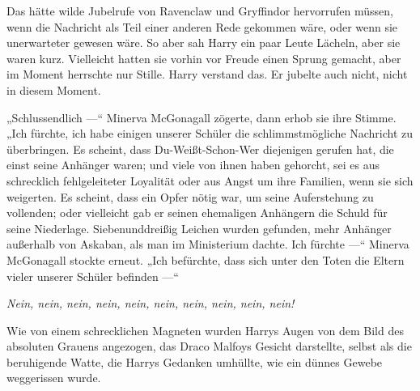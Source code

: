 Das hätte wilde Jubelrufe von Ravenclaw und Gryffindor hervorrufen müssen, wenn die Nachricht als Teil einer anderen Rede gekommen wäre, oder wenn sie unerwarteter gewesen wäre. So aber sah Harry ein paar Leute Lächeln, aber sie waren kurz. Vielleicht hatten sie vorhin vor Freude einen Sprung gemacht, aber im Moment herrschte nur Stille. Harry verstand das. Er jubelte auch nicht, nicht in diesem Moment.

„Schlussendlich —“ Minerva McGonagall zögerte, dann erhob sie ihre Stimme.
„Ich fürchte, ich habe einigen unserer Schüler die schlimmstmögliche Nachricht zu überbringen. Es scheint, dass Du-Weißt-Schon-Wer diejenigen gerufen hat, die einst seine Anhänger waren; und viele von ihnen haben gehorcht, sei es aus schrecklich fehlgeleiteter Loyalität oder aus Angst um ihre Familien, wenn sie sich weigerten. Es scheint, dass ein Opfer nötig war, um seine Auferstehung zu vollenden; oder vielleicht gab er seinen ehemaligen Anhängern die Schuld für seine Niederlage. Siebenunddreißig Leichen wurden gefunden, mehr Anhänger außerhalb von Askaban, als man im Ministerium dachte. Ich fürchte —“
Minerva McGonagall stockte erneut.
„Ich befürchte, dass sich unter den Toten die Eltern vieler unserer Schüler befinden —“

\emph{Nein, nein, nein, nein, nein, nein, nein, nein, nein, nein!}

Wie von einem schrecklichen Magneten wurden Harrys Augen von dem Bild des absoluten Grauens angezogen, das Draco Malfoys Gesicht darstellte, selbst als die beruhigende Watte, die Harrys Gedanken umhüllte, wie ein dünnes Gewebe weggerissen wurde.

